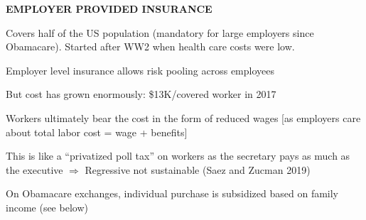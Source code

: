 \documentclass[landscape]{slides}
\begin{document}
%


\begin{slide}
\begin{center}
{\bf EMPLOYER PROVIDED INSURANCE}
\end{center}
Covers half of the US population (mandatory for large employers since Obamacare). Started after WW2 when health care costs were low.

Employer level insurance allows risk pooling across employees

But cost has grown enormously: \$13K/covered worker in 2017

Workers ultimately bear the cost in the form of reduced wages
[as employers care about total labor cost = wage + benefits]

This is like a ``privatized poll tax'' on workers as the secretary pays as much as the executive 
$\Rightarrow$ Regressive not sustainable (Saez and Zucman 2019)

On Obamacare exchanges, individual purchase is subsidized based on family income (see below)

%
%
%
%

\end{slide}


\begin{slide}

\end{slide}
\end{document}
